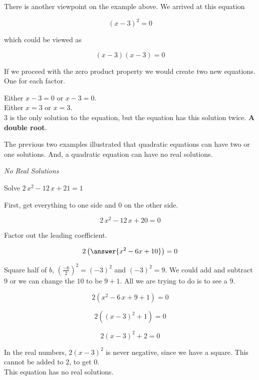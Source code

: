 \documentclass{ximera}
\begin{document}
There is another viewpoint on the example above.  We arrived at this equation

\[  (x - 3)^2 = 0  \]

which could be viewed as 

\[  (x - 3) (x - 3) = 0  \]


If we proceed with the zero product property we would create two new equations.  One for each factor.

Either $x - 3 = 0$   or $x - 3 = 0$. \\

Either $x = 3$ or $x = 3$.  \\

$3$ is the only solution to the equation, but the equation has this solution twice. \textbf{\textcolor{red!80!black}{A double root}}.


The previous two examples illustrated that quadratic equations can have two or one solutions.  And, a quadratic equation can have no real solutions.










\begin{example} \textit{No Real Solutions}

Solve $2 \, x^2 - 12 \, x + 21 = 1$ \\

\begin{explanation}

First, get everything to one side and $0$ on the other side.



\[  2 \, x^2 - 12 \, x + 20 = 0  \]

Factor out the leading coefficient.

\[  2 \left( \answer{x^2 - 6x + 10} \right) = 0  \]


Square half of $b$, $\left(\frac{-6}{2}\right)^2 = (-3)^2$ and $(-3)^2 = 9$.  We could add and subtract $9$ or we can change the $10$ to be $9+1$.  All we are trying to do is to see a $9$.



\[  2 (x^2 - 6 \, x + 9 + 1) = 0  \]


\[  2 ((x-3)^2 + 1) = 0  \]


\[  2 (x-3)^2 + 2 = 0  \]

In the real numbers, $2 (x-3)^2$ is never negative, since we have a square.  This cannot be added to $2$, to get $0$.  \\


This equation has no real solutions.


\end{explanation}
\end{example}
\end{document}

